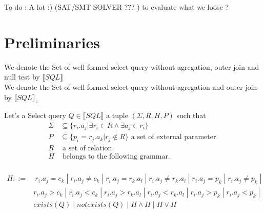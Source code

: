 
To do : A lot :) 
(SAT/SMT SOLVER ??? ) to evaluate what we loose ?  

\section{Preliminaries}

\begin{mydef}
	We denote the Set of well formed select query without agregation, outer join and null test by $\llbracket SQL\rrbracket$
	\\We denote the Set of well formed select query without agregation and outer join by $\llbracket SQL\rrbracket _\bot$
\end{mydef}

\begin{mydef}
Let's a Select query $Q \in \llbracket SQL\rrbracket$ a tuple $(\Sigma,R,H,P)$ such that
\begin{align*}
\Sigma & \subseteq \{r_i.a_j | \exists r_i \in R \land \exists a_j \in r_i \} \\
P & \subseteq \{p_i = r_j.a_k | r_j \notin R\} \mbox{ a set of external parameter.}\\
R & \mbox{ a set of relation.}\\
H &  \mbox{ belongs to the following grammar.}\\
\end{align*}

\begin{align*}
H ::= &\ r_i.a_j = c_k \; |\; r_i.a_j \neq c_k \; |\; r_i.a_j = r_k.a_l \; |\;  r_i.a_j \neq r_k.a_l \;  |\; r_i.a_j = p_k\; |\; r_i.a_j \neq p_k\; |\; 
\\ & r_i.a_j > c_k \; |\; r_i.a_j < c_k \; |\; r_i.a_j > r_k.a_l \; |\;  r_i.a_j < r_k.a_l \;  |\; r_i.a_j > p_k\; |\; r_i.a_j < p_k\; |\; 
\\ &  exists(Q) \; |\; notexists(Q) \; |\;  H\land H \; |\; H \lor H 
\end{align*}

\end{mydef}

